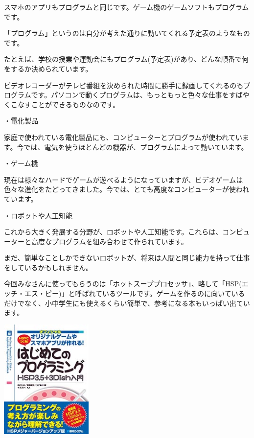 \documentclass[a4paper,dvipdfmx]{jarticle}
\begin{document}
\bigskip

スマホのアプリもプログラムと同じです。ゲーム機のゲームソフトもプログラムです。

「プログラム」というのは自分が考えた通りに動いてくれる予定表のようなものです。

たとえば、学校の授業や運動会にもプログラム(予定表)があり、どんな順番で何をするか決められています。

ビデオレコーダーがテレビ番組を決められた時間に勝手に録画してくれるのもプログラムです。パソコンで動くプログラムは、もっともっと色々な仕事をすばやくこなすことができるものなのです。


\bigskip

・電化製品


\bigskip

家庭で使われている電化製品にも、コンピューターとプログラムが使われています。今では、電気を使うほとんどの機器が、プログラムによって動いています。


\bigskip

・ゲーム機


\bigskip

現在は様々なハードでゲームが遊べるようになっていますが、ビデオゲームは色々な進化をたどってきました。今では、とても高度なコンピューターが使われています。


\bigskip

・ロボットや人工知能


\bigskip

これから大きく発展する分野が、ロボットや人工知能です。これらは、コンピューターと高度なプログラムを組み合わせて作られています。

まだ、簡単なことしかできないロボットが、将来は人間と同じ能力を持って仕事をしているかもしれません。

今回みなさんに使ってもらうのは「ホットスーププロセッサ」、略して「HSP(エッチ・エス・ピー)」と呼ばれているツールです。ゲームを作るのに向いているだけでなく、小中学生にも使えるくらい簡単で、参考になる本もいっぱい出ています。


\bigskip



\begin{center}
\includegraphics[width=4.576cm,height=5.928cm]{text02-img/text02-img007.jpg}

\end{center}
\end{document}
